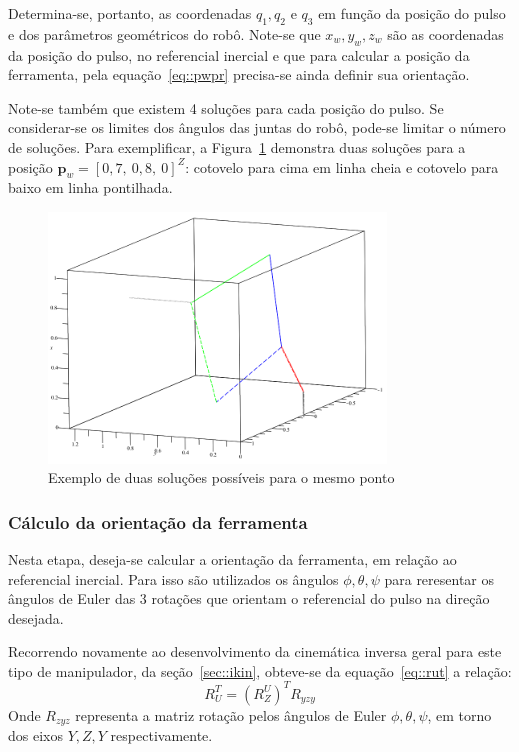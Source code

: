 %
Determina-se, portanto, as coordenadas $q_1, q_2$ e $q_3$ em função da posição
do pulso e dos parâmetros geométricos do robô.
Note-se que $x_w, y_w, z_w$ são as coordenadas da posição do pulso, no
referencial inercial e que para calcular a posição da ferramenta, pela
equação~\ref{eq::pwpr} precisa-se ainda definir sua orientação.

Note-se também que existem 4 soluções para cada posição do pulso. Se
considerar-se os limites dos ângulos das juntas do robô, pode-se limitar o
número de soluções. Para exemplificar, a Figura~\ref{fig::elbowupdown} demonstra
duas soluções para a posição $\mathbf{p}_{w} = [0,7,~ 0,8,~ 0]^Z$: cotovelo para
cima em linha cheia e cotovelo para baixo em linha pontilhada.

\begin{figure}[h]
	\centering 
 	\includegraphics[width=0.80\textwidth]{figs/elbowupdown}
 	\caption{Exemplo de duas soluções possíveis para o mesmo ponto}
 	\label{fig::elbowupdown}
\end{figure}


\subsubsection{Cálculo da orientação da ferramenta}

Nesta etapa, deseja-se calcular a orientação da ferramenta, em relação ao
referencial inercial. Para isso são utilizados os ângulos $\phi,\theta,\psi$
para reresentar os ângulos de Euler das 3 rotações que orientam o referencial do
pulso na direção desejada.

Recorrendo novamente ao desenvolvimento da cinemática inversa geral para este
tipo de manipulador, da seção~\ref{sec::ikin}, obteve-se da
equação~\ref{eq::rut} a relação:
%
\begin{equation*}
	R_{U}^{T} = (R_{Z}^{U})^T R_{yzy}
\end{equation*}
%
Onde $R_{zyz}$ representa a matriz rotação pelos ângulos de Euler
$\phi,\theta,\psi$, em torno dos eixos $Y,Z,Y$ respectivamente.

